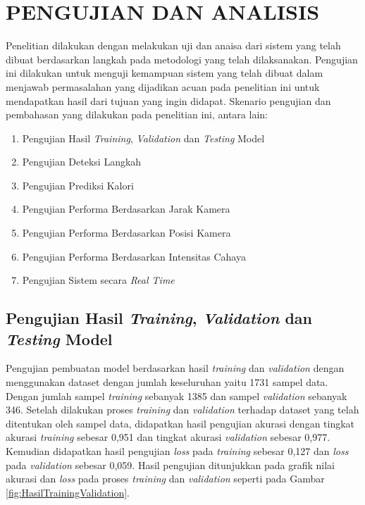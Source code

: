 \chapter{PENGUJIAN DAN ANALISIS}
\label{chap:pengujiananalisis}


Penelitian dilakukan dengan melakukan uji dan anaisa dari sistem yang telah dibuat berdasarkan langkah pada metodologi yang telah dilaksanakan. Pengujian ini dilakukan untuk menguji kemampuan sistem yang telah dibuat dalam menjawab permasalahan yang dijadikan acuan pada penelitian ini untuk mendapatkan hasil dari tujuan yang ingin didapat. Skenario pengujian dan pembahasan yang dilakukan pada penelitian ini, antara lain:

\begin{enumerate}[nolistsep]

  \item Pengujian Hasil \emph{Training}, \emph{Validation} dan \emph{Testing} Model

  \item Pengujian Deteksi Langkah 

  \item Pengujian Prediksi Kalori
  
  \item Pengujian Performa Berdasarkan Jarak Kamera
  
  \item Pengujian Performa Berdasarkan Posisi Kamera
  
  \item Pengujian Performa Berdasarkan Intensitas Cahaya
  
  \item Pengujian Sistem secara \emph{Real Time}

\end{enumerate}

\section{Pengujian Hasil \emph{Training}, \emph{Validation} dan \emph{Testing} Model}
\label{sec:PengujianTrainingValidation}

Pengujian pembuatan model berdasarkan hasil \emph{training} dan \emph{validation} dengan menggunakan dataset dengan jumlah keseluruhan yaitu 1731 sampel data. Dengan jumlah sampel \emph{training} sebanyak 1385 dan sampel \emph{validation} sebanyak 346. Setelah dilakukan proses \emph{training} dan \emph{validation} terhadap dataset yang telah ditentukan oleh sampel data, didapatkan hasil pengujian akurasi dengan tingkat akurasi \emph{training} sebesar 0,951 dan tingkat akurasi \emph{validation} sebesar 0,977. Kemudian didapatkan hasil pengujian \emph{loss} pada \emph{training} sebesar 0,127 dan \emph{loss} pada \emph{validation} sebesar 0,059. Hasil pengujian ditunjukkan pada grafik nilai akurasi dan \emph{loss} pada proses \emph{training} dan \emph{validation} seperti pada Gambar \ref{fig:HasilTrainingValidation}.

